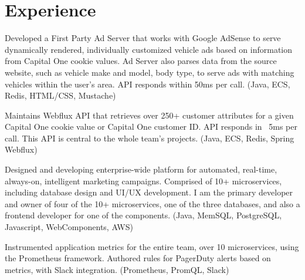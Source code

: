 \documentclass[letterpaper]{deedy-resume-openfont} %
\begin{document}
\hfill
%
%
\begin{minipage}[t]{0.7\textwidth} %


\section{Experience}


\vspace{\topsep} %

\begin{tightemize}
\item Developed a First Party Ad Server that works with Google AdSense to serve dynamically rendered, individually customized vehicle ads based on information from Capital One cookie values. Ad Server also parses data from the source website, such as vehicle make and model, body type, to serve ads with matching vehicles within the user's area. API responds within 50ms per call. (Java, ECS, Redis, HTML/CSS, Mustache)
\item Maintains Webflux API that retrieves over 250+ customer attributes for  a given Capital One cookie value or Capital One customer ID. API responds in ~5ms per call. This API is central to the whole team's projects. (Java, ECS, Redis, Spring Webflux)
\item Designed and developing enterprise-wide platform for automated, real-time, always-on, intelligent marketing campaigns. Comprised of 10+ microservices, including database design and UI/UX development. I am the primary developer and owner of four of the 10+ microservices, one of the three databases, and also a frontend developer for one of the components. (Java, MemSQL, PostgreSQL, Javascript, WebComponents, AWS)
\item Instrumented application metrics for the entire team, over 10 microservices, using the Prometheus framework. Authored rules for PagerDuty alerts based on metrics, with Slack integration. (Prometheus, PromQL, Slack) 
\end{tightemize}


\end{minipage}
\end{document}
